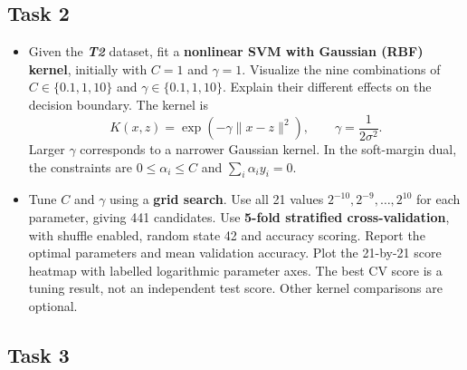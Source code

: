 \documentclass[12pt,a4paper]{article}
\begin{document}
\subsection{Task 2}

\begin{itemize}
  \item Given the \textbf{\textit{T2}} dataset, fit a \textbf{nonlinear SVM with
        Gaussian (RBF) kernel}, initially with $C=1$ and $\gamma=1$.
        Visualize the nine combinations of $C\in\{0.1,1,10\}$ and
        $\gamma\in\{0.1,1,10\}$. Explain their different effects on the
        decision boundary. The kernel is
        \[
          K(x,z)=\exp\!\left(-\gamma\lVert x-z\rVert^2\right),
          \qquad \gamma=\frac{1}{2\sigma^2}.
        \]
        Larger $\gamma$ corresponds to a narrower Gaussian kernel. In the
        soft-margin dual, the constraints are $0\leq\alpha_i\leq C$ and
        $\sum_i\alpha_i y_i=0$.

  \item Tune $C$ and $\gamma$ using a \textbf{grid search}. Use all 21 values
        $2^{-10},2^{-9},\ldots,2^{10}$ for each parameter, giving 441 candidates.
        Use \textbf{5-fold stratified cross-validation}, with shuffle enabled,
        random state 42 and accuracy scoring. Report the optimal parameters and
        mean validation accuracy. Plot the 21-by-21 score heatmap with labelled
        logarithmic parameter axes. The best CV score is a tuning result, not an
        independent test score. Other kernel comparisons are optional.
\end{itemize}

\subsection{Task 3}
\end{document}

